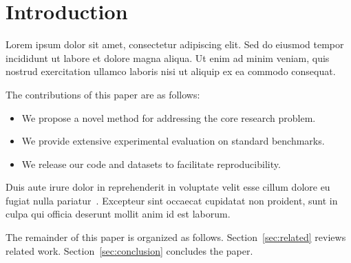\section{Introduction}
\label{sec:introduction}

Lorem ipsum dolor sit amet, consectetur adipiscing elit. Sed do eiusmod tempor
incididunt ut labore et dolore magna aliqua. Ut enim ad minim veniam, quis
nostrud exercitation ullamco laboris nisi ut aliquip ex ea commodo consequat.

The contributions of this paper are as follows:
\begin{itemize}
    \item We propose a novel method for addressing the core research problem.
    \item We provide extensive experimental evaluation on standard benchmarks.
    \item We release our code and datasets to facilitate reproducibility.
\end{itemize}

Duis aute irure dolor in reprehenderit in voluptate velit esse cillum dolore eu
fugiat nulla pariatur~\cite{placeholder2024}. Excepteur sint occaecat cupidatat
non proident, sunt in culpa qui officia deserunt mollit anim id est laborum.

The remainder of this paper is organized as follows. Section~\ref{sec:related}
reviews related work. Section~\ref{sec:conclusion} concludes the paper.
